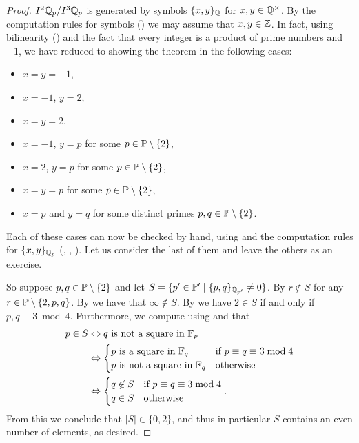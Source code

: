 \documentclass[12pt, leqno, british]{amsart}
\begin{document}
\begin{proof}
$I^2\mathbb Q_p/I^3\mathbb Q_p$ is generated by symbols $\lbrace x, y \rbrace_{\mathbb Q}$ for $x, y \in \mathbb Q^\times$.
By the computation rules for symbols () we may assume that $x, y \in \mathbb Z$.
In fact, using bilinearity () and the fact that every integer is a product of prime numbers and $\pm 1$, we have reduced to showing the theorem in the following cases:
\begin{itemize}
\item $x = y = -1$,
\item $x = -1$, $y = 2$,
\item $x = y = 2$,
\item $x = -1$, $y = p$ for some $p \in \mathbb P \setminus \lbrace 2 \rbrace$,
\item $x = 2$, $y = p$ for some $p \in \mathbb P \setminus \lbrace 2 \rbrace$,
\item $x = y = p$ for some $p \in \mathbb P \setminus \lbrace 2 \rbrace$,
\item $x = p$ and $y = q$ for some distinct primes $p, q \in \mathbb P \setminus \lbrace 2 \rbrace$.
\end{itemize}
Each of these cases can now be checked by hand, using  and the computation rules for $\lbrace x, y \rbrace_{\mathbb Q_p}$ (, , ).
Let us consider the last of them and leave the others as an exercise.

So suppose $p, q \in \mathbb P \setminus \lbrace 2 \rbrace$ and let $S = \lbrace p' \in \mathbb P' \mid \lbrace p, q \rbrace_{\mathbb Q_{p'}} \neq 0 \rbrace$.
By  $r \not\in S$ for any $r \in \mathbb P \setminus \lbrace 2,p,q\rbrace$.
By  we have that $\infty \not\in S$.
By  we have $2 \in S$ if and only if $p, q \equiv 3 \bmod 4$.
Furthermore, we compute using  and  that
\begin{align*}
p \in S &\Leftrightarrow q \text{ is not a square in } \mathbb F_p \\
&\Leftrightarrow \begin{cases}
p \text{ is a square in } \mathbb F_q &\text{if } p \equiv q \equiv 3 \bmod 4 \\
p \text{ is not a square in } \mathbb F_q &\text{otherwise}
\end{cases} \\
&\Leftrightarrow \begin{cases}
q \not\in S &\text{if } p \equiv q \equiv 3 \bmod 4 \\
q \in S &\text{otherwise}
\end{cases}.
\end{align*}
From this we conclude that $\lvert S \rvert \in \lbrace 0, 2 \rbrace$, and thus in particular $S$ contains an even number of elements, as desired.
\end{proof}
\end{document}
